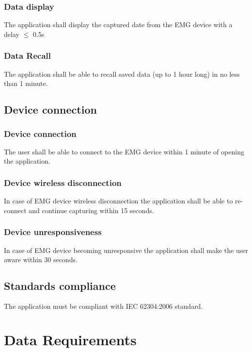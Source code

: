 \documentclass[12pt,a4paper]{article}
\begin{document}
\subsubsection{Data display}

The application shall display the captured date from the EMG device with a delay $\leq$ 0.5s

\subsubsection{Data Recall}

The application shall be able to recall saved data (up to 1 hour long) in no less than 1 minute.

\subsection{Device connection}

\subsubsection{Device connection}

The user shall be able to connect to the EMG device within 1 minute of opening the application.

\subsubsection{Device wireless disconnection}

In case of EMG device wireless disconnection the application shall be able to re-connect and continue capturing within 15 seconds.

\subsubsection{Device unresponsiveness}

In case of EMG device becoming unresponsive the application shall make the user aware within 30 seconds.

\subsection{Standards compliance}

The application must be compliant with IEC 62304:2006 standard.

\newpage

\section{Data Requirements}
\end{document}
